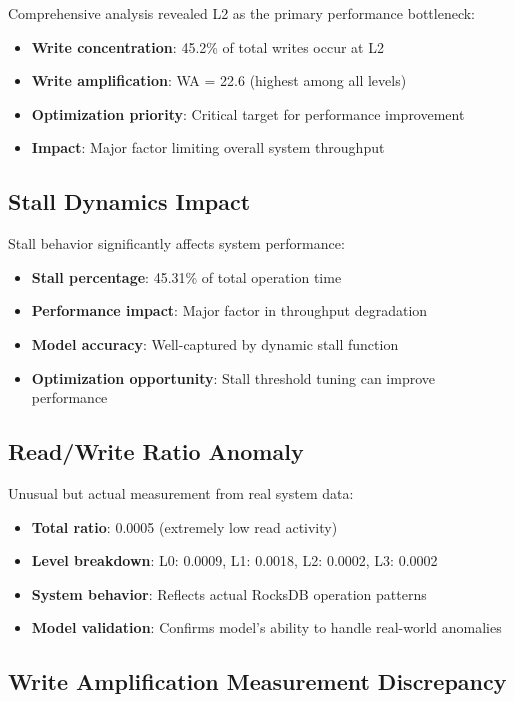 \documentclass[11pt,twocolumn]{article}
\begin{document}
Comprehensive analysis revealed L2 as the primary performance bottleneck:
\begin{itemize}
    \item \textbf{Write concentration}: 45.2\% of total writes occur at L2
    \item \textbf{Write amplification}: WA = 22.6 (highest among all levels)
    \item \textbf{Optimization priority}: Critical target for performance improvement
    \item \textbf{Impact}: Major factor limiting overall system throughput
\end{itemize}

\subsection{Stall Dynamics Impact}

Stall behavior significantly affects system performance:
\begin{itemize}
    \item \textbf{Stall percentage}: 45.31\% of total operation time
    \item \textbf{Performance impact}: Major factor in throughput degradation
    \item \textbf{Model accuracy}: Well-captured by dynamic stall function
    \item \textbf{Optimization opportunity}: Stall threshold tuning can improve performance
\end{itemize}

\subsection{Read/Write Ratio Anomaly}

Unusual but actual measurement from real system data:
\begin{itemize}
    \item \textbf{Total ratio}: 0.0005 (extremely low read activity)
    \item \textbf{Level breakdown}: L0: 0.0009, L1: 0.0018, L2: 0.0002, L3: 0.0002
    \item \textbf{System behavior}: Reflects actual RocksDB operation patterns
    \item \textbf{Model validation}: Confirms model's ability to handle real-world anomalies
\end{itemize}

\subsection{Write Amplification Measurement Discrepancy}
\end{document}

